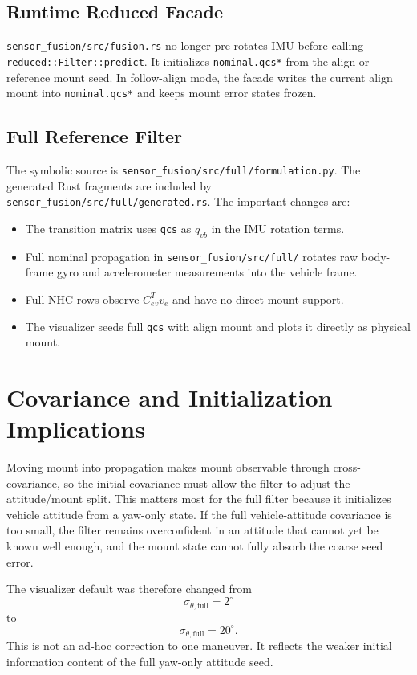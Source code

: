\documentclass[11pt]{article}
\newcommand{\T}{^{T}}
\begin{document}
\subsection{Runtime Reduced Facade}

\texttt{sensor_fusion/src/fusion.rs} no longer pre-rotates IMU before calling
\texttt{reduced::Filter::predict}. It initializes \texttt{nominal.qcs*} from the align
or reference mount seed. In follow-align mode, the facade writes the current
align mount into \texttt{nominal.qcs*} and keeps mount error states frozen.

\subsection{Full Reference Filter}

The symbolic source is \texttt{sensor_fusion/src/full/formulation.py}. The generated Rust
fragments are included by \texttt{sensor_fusion/src/full/generated.rs}. The important
changes are:
\begin{itemize}[leftmargin=*]
  \item The transition matrix uses \texttt{qcs} as \(q_{vb}\) in the IMU
        rotation terms.
  \item Full nominal propagation in \texttt{sensor_fusion/src/full/} rotates raw
        body-frame gyro and accelerometer measurements into the vehicle frame.
  \item Full NHC rows observe \(C_{ev}\T v_e\) and have no direct mount
        support.
  \item The visualizer seeds full \texttt{qcs} with align mount and plots it
        directly as physical mount.
\end{itemize}

\section{Covariance and Initialization Implications}

Moving mount into propagation makes mount observable through cross-covariance,
so the initial covariance must allow the filter to adjust the attitude/mount
split. This matters most for the full filter because it initializes vehicle
attitude from a yaw-only state. If the full vehicle-attitude covariance is too
small, the filter remains overconfident in an attitude that cannot yet be known
well enough, and the mount state cannot fully absorb the coarse seed error.

The visualizer default was therefore changed from
\begin{equation}
  \sigma_{\theta,\mathrm{full}}=2^\circ
\end{equation}
to
\begin{equation}
  \sigma_{\theta,\mathrm{full}}=20^\circ.
\end{equation}
This is not an ad-hoc correction to one maneuver. It reflects the weaker
initial information content of the full yaw-only attitude seed.
\end{document}
